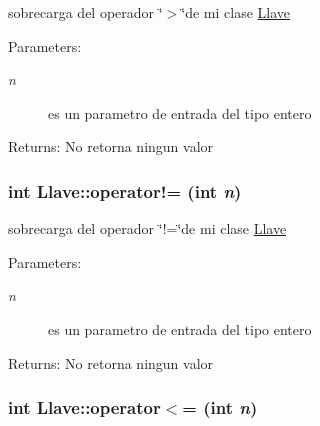 sobrecarga del operador \char`\"{}$>$\char`\"{}de mi clase \hyperlink{classLlave}{Llave} \begin{Desc}
\item[Parameters:]
\begin{description}
\item[{\em n}]es un parametro de entrada del tipo entero \end{description}
\end{Desc}
\begin{Desc}
\item[Returns:]No retorna ningun valor \end{Desc}
\hypertarget{classLlave_c4fdcbca296854f56c8ec7606c15ca40}{
\subsubsection[operator"!=]{\setlength{\rightskip}{0pt plus 5cm}int Llave::operator!= (int {\em n})}}
\label{classLlave_c4fdcbca296854f56c8ec7606c15ca40}


sobrecarga del operador \char`\"{}!=\char`\"{}de mi clase \hyperlink{classLlave}{Llave} \begin{Desc}
\item[Parameters:]
\begin{description}
\item[{\em n}]es un parametro de entrada del tipo entero \end{description}
\end{Desc}
\begin{Desc}
\item[Returns:]No retorna ningun valor \end{Desc}
\hypertarget{classLlave_6953a596b1bc6e951ef5ca434b5c1036}{
\subsubsection[operator$<$=]{\setlength{\rightskip}{0pt plus 5cm}int Llave::operator$<$= (int {\em n})}}
\label{classLlave_6953a596b1bc6e951ef5ca434b5c1036}


